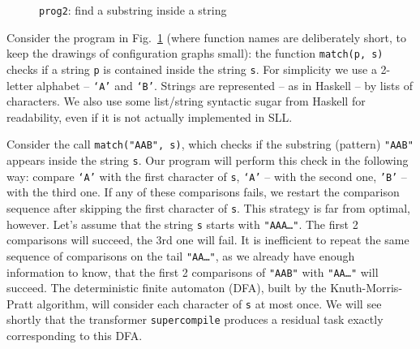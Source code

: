 \begin{figure}[t!]
\caption{\texttt{prog2}: find a substring inside a string}
\label{fig:prog2}

\end{figure}

Consider the program in Fig.~\ref{fig:prog2}
(where function names are deliberately short, to keep the drawings of configuration
graphs small):
the function \texttt{match(p, s)} checks if a string \texttt{p}
is contained inside the string \texttt{s}.
For simplicity we use a 2-letter alphabet -- \texttt{`A'} and \texttt{`B'}. 
Strings are represented -- as in Haskell -- by lists of characters.
We also use some list/string syntactic sugar from
Haskell for readability, even if it is not actually implemented in SLL.

Consider the call \texttt{match("AAB", s)}, 
which checks if the substring (pattern) \texttt{"AAB"} appears inside the string \texttt{s}.
Our program will perform this check in the following way: compare \texttt{`A'}
with the first character of \texttt{s}, \texttt{`A'} -- with the second one,
\texttt{'B'} -- with the third one.
If any of these comparisons fails, we restart the comparison sequence
after skipping the first character of \texttt{s}.
This strategy is far from optimal, however.
Let's assume that the string \texttt{s} starts with \texttt{"AAA\ldots"}.
The first 2 comparisons will succeed, the 3rd one will fail.
It is inefficient to repeat the same sequence of comparisons
on the tail \texttt{"AA\ldots"},
as we already have enough information to know, that the first 2 comparisons of \texttt{"AAB"}
with \texttt{"AA\ldots"} will succeed. 
The deterministic finite automaton (DFA), built by the Knuth-Morris-Pratt algorithm,
will consider each character of \texttt{s} at most once.
We will see shortly that the transformer \texttt{supercompile} produces
a residual task exactly corresponding to this DFA.


